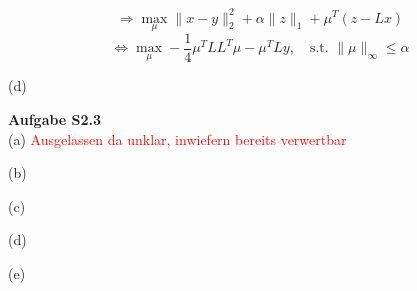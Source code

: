 \documentclass[ngerman, a4paper,12pt]{article}
\begin{document}
\begin{equation*}
  \Rightarrow \max_\mu \|x-y\|_2^2+\alpha\|z\|_1+\mu^T(z-Lx)
\end{equation*}
\begin{equation*}
  \Leftrightarrow \max_\mu -\frac{1}{4}\mu^TLL^T\mu-\mu^TLy,\quad \text{s.t. } \|\mu\|_\infty\leq\alpha
\end{equation*}

\par
(d) \par



\textbf{Aufgabe S2.3} \\

(a) \textcolor{red}{Ausgelassen da unklar, inwiefern bereits verwertbar}


\par
(b)  
\par
(c) 
\par
(d) 
\par
(e)
\par
\end{document}
